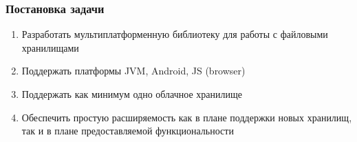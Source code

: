 \documentclass[14pt,aspectratio=169,hyperref={pdftex,unicode},xcolor=dvipsnames]{beamer}
\begin{document}
\begin{frame}
\frametitle{Постановка задачи}
\begin{enumerate}
\item Разработать мультиплатформенную библиотеку для работы с файловыми хранилищами
\item Поддержать платформы JVM, Android, JS (browser)
\item Поддержать как минимум одно облачное хранилище
\item Обеспечить простую расширяемость как в плане поддержки новых хранилищ, так и в плане предоставляемой функциональности
\end{enumerate}
\end{frame}
\end{document}
